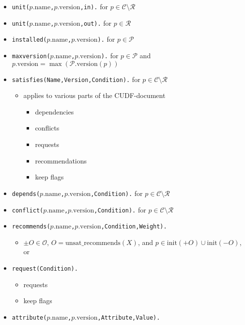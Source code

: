 \documentclass[a4paper,english]{article}
\begin{document}
\begin{itemize}
  \item \texttt{unit($p.\mathrm{name}$,$p.\mathrm{version}$,in).} for $p\in\mathcal{C}\setminus\mathcal{R}$
  \item \texttt{unit($p.\mathrm{name}$,$p.\mathrm{version}$,out).} for $p\in\mathcal{R}$
  \item \texttt{installed($p.\mathrm{name}$,$p.\mathrm{version}$).} for $p\in\mathcal{P}$
  \item \texttt{maxversion($p.\mathrm{name}$,$p.\mathrm{version}$).} for $p\in\mathcal{P}$ and $p.\mathrm{version}=\max(\mathcal{P}.\mathrm{version}(p))$
  \item \texttt{satisfies(Name,Version,Condition).} for $p\in\mathcal{C}\setminus\mathcal{R}$
    \begin{itemize}
      \item applies to various parts of the CUDF-document
        \begin{itemize}
          \item dependencies
          \item conflicts
          \item requests
          \item recommendations
          \item keep flags
        \end{itemize}
    \end{itemize}
  \item \texttt{depends($p.\mathrm{name}$,$p.\mathrm{version}$,Condition).} for $p\in\mathcal{C}\setminus\mathcal{R}$
  \item \texttt{conflict($p.\mathrm{name}$,$p.\mathrm{version}$,Condition).} for $p\in\mathcal{C}\setminus\mathcal{R}$
  \item \texttt{recommends($p.\mathrm{name}$,$p.\mathrm{version}$,Condition,Weight).}
    \begin{itemize}
      \item $\pm O\in\mathcal{O}$, $O=\mathrm{unsat\_recommends}(X)$, and $p\in\mathrm{init}({+}O)\cup\mathrm{init}({-}O)$, or
    \end{itemize}
  \item \texttt{request(Condition).}
    \begin{itemize}
      \item requests
      \item keep flags
    \end{itemize}
  \item \texttt{attribute($p.\mathrm{name}$,$p.\mathrm{version}$,Attribute,Value).}

\end{itemize}
\end{document}
